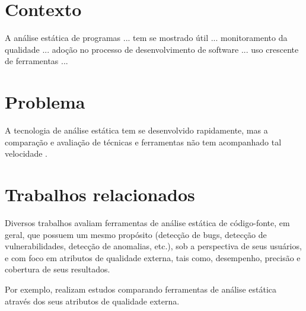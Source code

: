 
\section{Contexto}
A análise estática de programas ...
tem se mostrado útil ... monitoramento da qualidade ...
adoção no processo de desenvolvimento de software ...
uso crescente de ferramentas ... 

\section{Problema}

A tecnologia de análise estática tem se desenvolvido rapidamente, mas a
comparação e avaliação de técnicas e ferramentas não tem acompanhado tal
velocidade \cite{Li2010}.

\section{Trabalhos relacionados}

Diversos trabalhos avaliam ferramentas de análise estática de código-fonte,
em geral, que possuem um mesmo propósito (detecção de bugs, 
detecção de vulnerabilidades, detecção de anomalias, etc.),
sob a perspectiva de seus usuários, 
e com foco em atributos de qualidade externa, tais como, desempenho, 
precisão e cobertura de seus resultados. 

Por exemplo, \cite{Rutar2004}  \cite{Okun2007}
\cite{Emanuelsson2008} \cite{Wedyan2009} \cite{Mantere2009} 
\cite{Li2010} \cite{Johns2011} \cite{Alemerien2013} \cite{Ataide2014} realizam
estudos comparando ferramentas de análise estática através dos seus atributos
de qualidade externa.

